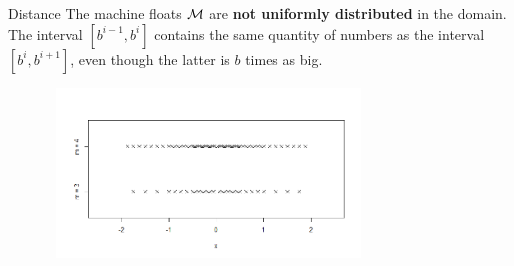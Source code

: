 \documentclass[11pt,compress,t,notes=noshow, xcolor=table]{beamer}
\begin{document}





\begin{vbframe}{Distance}
The machine floats $\mathcal{M}$ are \textbf{not
uniformly distributed} in the domain. The interval $[b^{i-1},b^i]$ contains the same quantity of numbers as the interval $[b^i,b^{i+1}]$, even though
the latter is $b$ times as big.

\begin{center}
\begin{figure}
  \includegraphics[height = 4.5cm, width = 8.5cm]{figure_man/Distance.png}
\end{figure}
\end{center}



\framebreak


\end{vbframe}
\end{document}
